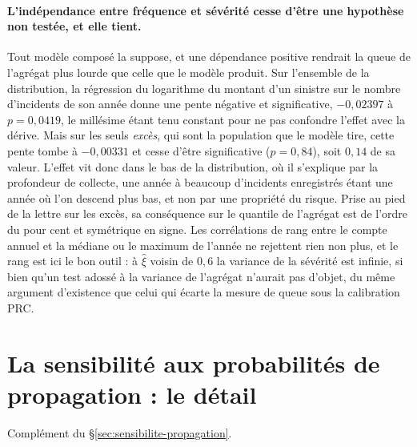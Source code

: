 \paragraph{L'indépendance entre fréquence et sévérité cesse d'être une hypothèse non testée, et
elle tient.} Tout modèle composé la suppose, et une dépendance positive rendrait la queue de
l'agrégat plus lourde que celle que le modèle produit. Sur l'ensemble de la distribution, la
régression du logarithme du montant d'un sinistre sur le nombre d'incidents de son année donne
une pente négative et significative, $-0{,}02397$ à $p = 0{,}0419$, le millésime étant tenu
constant pour ne pas confondre l'effet avec la dérive. Mais sur les seuls \emph{excès}, qui sont
la population que le modèle tire, cette pente tombe à $-0{,}00331$ et cesse d'être significative
($p = 0{,}84$), soit $0{,}14$ de sa valeur. L'effet vit donc dans le bas de la distribution, où il
s'explique par la profondeur de collecte, une année à beaucoup d'incidents enregistrés étant une
année où l'on descend plus bas, et non par une propriété du risque. Prise au pied de la lettre
sur les excès, sa conséquence sur le quantile de l'agrégat est de l'ordre du pour cent et
symétrique en signe. Les corrélations de rang entre le compte annuel et la médiane ou le maximum
de l'année ne rejettent rien non plus, et le rang est ici le bon outil : à $\hat\xi$ voisin de
$0{,}6$ la variance de la sévérité est infinie, si bien qu'un test adossé à la variance de
l'agrégat n'aurait pas d'objet, du même argument d'existence que celui qui écarte la mesure de
queue sous la calibration PRC.

\section{La sensibilité aux probabilités de propagation : le détail}
\label{sec:ann-sensibilite-propagation}


Complément du \S\ref{sec:sensibilite-propagation}.

